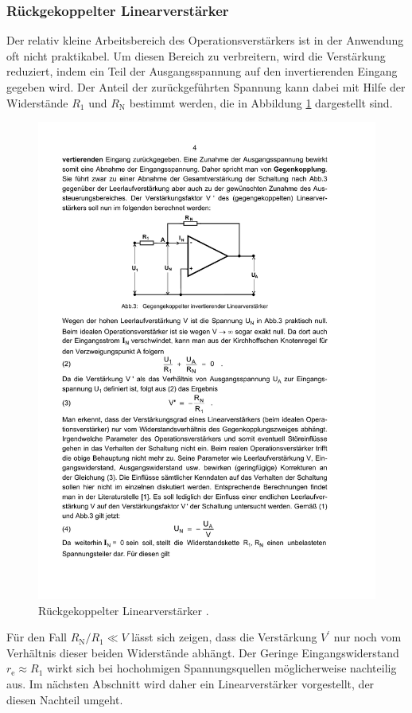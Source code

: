 \subsubsection{Rückgekoppelter Linearverstärker}
\label{subsubsec:rueck-linearverstärker}
Der relativ kleine Arbeitsbereich des Operationsverstärkers ist in der
Anwendung oft nicht praktikabel. Um diesen Bereich zu verbreitern, wird die
Verstärkung reduziert, indem ein Teil der Ausgangsspannung auf den
invertierenden Eingang gegeben wird.
Der Anteil der zurückgeführten Spannung kann dabei mit Hilfe der Widerstände
$R_1$ und $R_\text{N}$ bestimmt werden, die in Abbildung \ref{fig:linear}
dargestellt sind.
\begin{figure}
    \centering
    \includegraphics[width=0.7\linewidth]{img/linearverstaerker.pdf}
    \caption{Rückgekoppelter Linearverstärker \cite{V51}.}
    \label{fig:linear}
\end{figure}
Für den Fall $R_\text{N}/R_1 \ll V$
lässt sich zeigen, dass die Verstärkung $V^\prime$ nur noch vom Verhältnis
dieser beiden Widerstände abhängt.
Der Geringe Eingangswiderstand $r_\text{e} \approx R_1$ wirkt sich bei
hochohmigen Spannungsquellen möglicherweise nachteilig aus. Im nächsten
Abschnitt wird daher ein Linearverstärker vorgestellt, der diesen Nachteil
umgeht.

